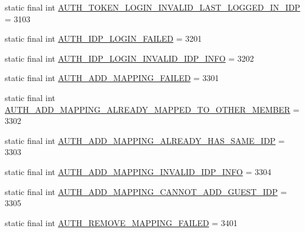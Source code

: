 \begin{DoxyCompactItemize}
\item 
static final int \hyperlink{classcom_1_1toast_1_1android_1_1gamebase_1_1base_1_1_gamebase_error_a943e4518d95e4dda2ad4b28dce7aa355}{A\+U\+T\+H\+\_\+\+T\+O\+K\+E\+N\+\_\+\+L\+O\+G\+I\+N\+\_\+\+I\+N\+V\+A\+L\+I\+D\+\_\+\+L\+A\+S\+T\+\_\+\+L\+O\+G\+G\+E\+D\+\_\+\+I\+N\+\_\+\+I\+DP} = 3103
\item 
static final int \hyperlink{classcom_1_1toast_1_1android_1_1gamebase_1_1base_1_1_gamebase_error_a763cdc51f2566c1933972492992a94ac}{A\+U\+T\+H\+\_\+\+I\+D\+P\+\_\+\+L\+O\+G\+I\+N\+\_\+\+F\+A\+I\+L\+ED} = 3201
\item 
static final int \hyperlink{classcom_1_1toast_1_1android_1_1gamebase_1_1base_1_1_gamebase_error_ad9705f588fccbb93aa85e0c6b0a9ca46}{A\+U\+T\+H\+\_\+\+I\+D\+P\+\_\+\+L\+O\+G\+I\+N\+\_\+\+I\+N\+V\+A\+L\+I\+D\+\_\+\+I\+D\+P\+\_\+\+I\+N\+FO} = 3202
\item 
static final int \hyperlink{classcom_1_1toast_1_1android_1_1gamebase_1_1base_1_1_gamebase_error_aa454a70f1941fc3d5ef4f6d6d9ce9764}{A\+U\+T\+H\+\_\+\+A\+D\+D\+\_\+\+M\+A\+P\+P\+I\+N\+G\+\_\+\+F\+A\+I\+L\+ED} = 3301
\item 
static final int \hyperlink{classcom_1_1toast_1_1android_1_1gamebase_1_1base_1_1_gamebase_error_a666b9ff84344649ceb8dfd19573e454f}{A\+U\+T\+H\+\_\+\+A\+D\+D\+\_\+\+M\+A\+P\+P\+I\+N\+G\+\_\+\+A\+L\+R\+E\+A\+D\+Y\+\_\+\+M\+A\+P\+P\+E\+D\+\_\+\+T\+O\+\_\+\+O\+T\+H\+E\+R\+\_\+\+M\+E\+M\+B\+ER} = 3302
\item 
static final int \hyperlink{classcom_1_1toast_1_1android_1_1gamebase_1_1base_1_1_gamebase_error_a84927f1b168239e1c6e4e06072d9f097}{A\+U\+T\+H\+\_\+\+A\+D\+D\+\_\+\+M\+A\+P\+P\+I\+N\+G\+\_\+\+A\+L\+R\+E\+A\+D\+Y\+\_\+\+H\+A\+S\+\_\+\+S\+A\+M\+E\+\_\+\+I\+DP} = 3303
\item 
static final int \hyperlink{classcom_1_1toast_1_1android_1_1gamebase_1_1base_1_1_gamebase_error_ab0b9adc67dd24e57bcdbe4b3c73432de}{A\+U\+T\+H\+\_\+\+A\+D\+D\+\_\+\+M\+A\+P\+P\+I\+N\+G\+\_\+\+I\+N\+V\+A\+L\+I\+D\+\_\+\+I\+D\+P\+\_\+\+I\+N\+FO} = 3304
\item 
static final int \hyperlink{classcom_1_1toast_1_1android_1_1gamebase_1_1base_1_1_gamebase_error_a3553979702d4ad952e9cacc24704c2eb}{A\+U\+T\+H\+\_\+\+A\+D\+D\+\_\+\+M\+A\+P\+P\+I\+N\+G\+\_\+\+C\+A\+N\+N\+O\+T\+\_\+\+A\+D\+D\+\_\+\+G\+U\+E\+S\+T\+\_\+\+I\+DP} = 3305
\item 
static final int \hyperlink{classcom_1_1toast_1_1android_1_1gamebase_1_1base_1_1_gamebase_error_a3396dd65877a836362332aaad021dfad}{A\+U\+T\+H\+\_\+\+R\+E\+M\+O\+V\+E\+\_\+\+M\+A\+P\+P\+I\+N\+G\+\_\+\+F\+A\+I\+L\+ED} = 3401

\end{DoxyCompactItemize}

